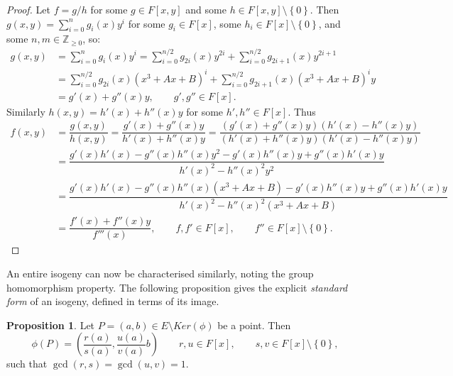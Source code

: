 \documentclass{article}
\newcommand{\Z}{\mathbb{Z}}
\newcommand{\rb}[1]{\left( #1 \right)}
\renewcommand{\sb}[1]{\left[ #1 \right]}
\newcommand{\cb}[1]{\left\{ #1 \right\}}
\theoremstyle{definition}\newtheorem*{definition}{Definition}
\theoremstyle{definition}\newtheorem*{example}{Example}
\theoremstyle{definition}\newtheorem*{remark}{Remark}
\newtheorem{proposition}{Proposition}[subsection]
\begin{document}
\begin{proof}
Let $ f = g / h $ for some $ g \in F\sb{x, y} $ and some $ h \in F\sb{x, y} \setminus \cb{0} $. Then $ g\rb{x, y} = \sum_{i = 0}^n g_i\rb{x}y^i $ for some $ g_i \in F\sb{x} $, some $ h_i \in F\sb{x} \setminus \cb{0} $, and some $ n, m \in \Z_{\ge 0} $, so:
\begin{align*}
g\rb{x, y}
& = \sum_{i = 0}^n g_i\rb{x}y^i
= \sum_{i = 0}^{n / 2} g_{2i}\rb{x}y^{2i} + \sum_{i = 0}^{n / 2} g_{2i + 1}\rb{x}y^{2i + 1} \\
& = \sum_{i = 0}^{n / 2} g_{2i}\rb{x}\rb{x^3 + Ax + B}^i + \sum_{i = 0}^{n / 2} g_{2i + 1}\rb{x}\rb{x^3 + Ax + B}^iy \\
& = g'\rb{x} + g''\rb{x}y, \qquad g', g'' \in F\sb{x}.
\end{align*}
Similarly $ h\rb{x, y} = h'\rb{x} + h''\rb{x}y $ for some $ h', h'' \in F\sb{x} $. Thus
\begin{align*}
f\rb{x, y}
& = \dfrac{g\rb{x, y}}{h\rb{x, y}}
= \dfrac{g'\rb{x} + g''\rb{x}y}{h'\rb{x} + h''\rb{x}y}
= \dfrac{\rb{g'\rb{x} + g''\rb{x}y}\rb{h'\rb{x} - h''\rb{x}y}}{\rb{h'\rb{x} + h''\rb{x}y}\rb{h'\rb{x} - h''\rb{x}y}} \\
& = \dfrac{g'\rb{x}h'\rb{x} - g''\rb{x}h''\rb{x}y^2 - g'\rb{x}h''\rb{x}y + g''\rb{x}h'\rb{x}y}{h'\rb{x}^2 - h''\rb{x}^2y^2} \\
& = \dfrac{g'\rb{x}h'\rb{x} - g''\rb{x}h''\rb{x}\rb{x^3 + Ax + B} - g'\rb{x}h''\rb{x}y + g''\rb{x}h'\rb{x}y}{h'\rb{x}^2 - h''\rb{x}^2\rb{x^3 + Ax + B}} \\
& = \dfrac{f'\rb{x} + f''\rb{x}y}{f'''\rb{x}}, \qquad f, f' \in F\sb{x}, \qquad f'' \in F\sb{x} \setminus \cb{0}.
\end{align*}
\end{proof}

\pagebreak

An entire isogeny can now be characterised similarly, noting the group homomorphism property. The following proposition gives the explicit \emph{standard form} of an isogeny, defined in terms of its image.

\begin{proposition}
Let $ P = \rb{a, b} \in E \setminus Ker\rb{\phi} $ be a point. Then
$$ \phi\rb{P} = \rb{\dfrac{r\rb{a}}{s\rb{a}}, \dfrac{u\rb{a}}{v\rb{a}}b} \qquad r, u \in F\sb{x}, \qquad s, v \in F\sb{x} \setminus \cb{0}, $$
such that $ \gcd\rb{r, s} = \gcd\rb{u, v} = 1 $.
\end{proposition}
\end{document}
